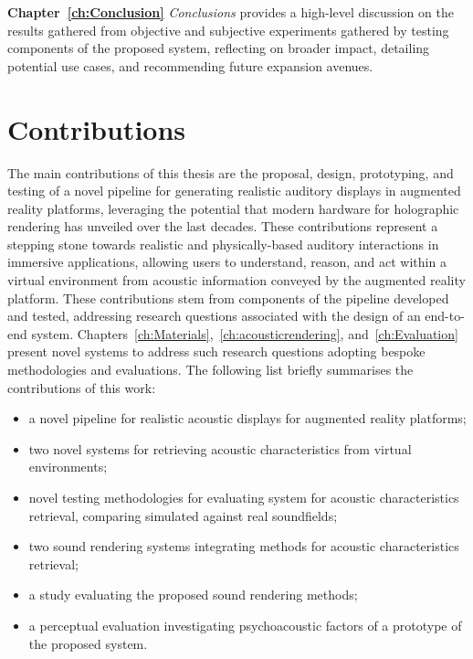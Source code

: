 \textbf{Chapter~\ref{ch:Conclusion}} \textit{Conclusions} provides a high-level discussion on the results gathered from objective and subjective experiments gathered by testing components of the proposed system, reflecting on broader impact, detailing potential use cases, and recommending future expansion avenues.

\section{Contributions}
The main contributions of this thesis are the proposal, design, prototyping, and testing of a novel pipeline for generating realistic auditory displays in augmented reality platforms, leveraging the potential that modern hardware for holographic rendering has unveiled over the last decades. These contributions represent a stepping stone towards realistic and physically-based auditory interactions in immersive applications, allowing users to understand, reason, and act within a virtual environment from acoustic information conveyed by the augmented reality platform.
These contributions stem from components of the pipeline developed and tested, addressing research questions associated with the design of an end-to-end system. Chapters~\ref{ch:Materials},~\ref{ch:acousticrendering}, and~\ref{ch:Evaluation} present novel systems to address such research questions adopting bespoke methodologies and evaluations. The following list briefly summarises the contributions of this work:
\begin{itemize}
    \item a novel pipeline for realistic acoustic displays for augmented reality platforms;
    \item two novel systems for retrieving acoustic characteristics from virtual environments;
    \item novel testing methodologies for evaluating system for acoustic characteristics retrieval, comparing simulated against real soundfields;
    \item two sound rendering systems integrating methods for acoustic characteristics retrieval;
    \item a study evaluating the proposed sound rendering methods;
    \item a perceptual evaluation investigating psychoacoustic factors of a prototype of the proposed system.
\end{itemize}

